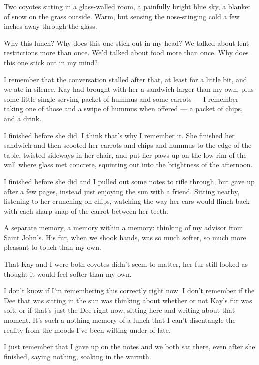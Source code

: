 Two coyotes sitting in a glass-walled room, a painfully bright blue sky, a blanket of snow on the grass outside. Warm, but sensing the nose-stinging cold a few inches away through the glass.

Why this lunch? Why does this one stick out in my head? We talked about lent restrictions more than once. We'd talked about food more than once. Why does this one stick out in my mind?

I remember that the conversation stalled after that, at least for a little bit, and we ate in silence. Kay had brought with her a sandwich larger than my own, plus some little single-serving packet of hummus and some carrots --- I remember taking one of those and a swipe of hummus when offered --- a packet of chips, and a drink.

I finished before she did. I think that's why I remember it. She finished her sandwich and then scooted her carrots and chips and hummus to the edge of the table, twisted sideways in her chair, and put her paws up on the low rim of the wall where glass met concrete, squinting out into the brightness of the afternoon.

I finished before she did and I pulled out some notes to rifle through, but gave up after a few pages, instead just enjoying the sun with a friend. Sitting nearby, listening to her crunching on chips, watching the way her ears would flinch back with each sharp snap of the carrot between her teeth.

A separate memory, a memory within a memory: thinking of my advisor from Saint John's. His fur, when we shook hands, was so much softer, so much more pleasant to touch than my own.

That Kay and I were both coyotes didn't seem to matter, her fur still looked as thought it would feel softer than my own.

I don't know if I'm remembering this correctly right now. I don't remember if the Dee that was sitting in the sun was thinking about whether or not Kay's fur was soft, or if that's just the Dee right now, sitting here and writing about that moment. It's such a nothing memory of a lunch that I can't disentangle the reality from the moods I've been wilting under of late.

I just remember that I gave up on the notes and we both sat there, even after she finished, saying nothing, soaking in the warmth.

\section{}

